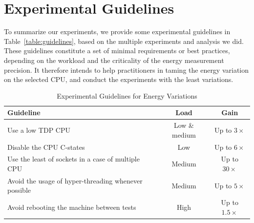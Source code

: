 
\section{Experimental Guidelines}\label{sec:guidelines}
To summarize our experiments, we provide some experimental guidelines in Table~\ref{table:guidelines}, based on the multiple experiments and analysis we did.
These guidelines constitute a set of minimal requirements or best practices, depending on the workload and the criticality of the energy measurement precision.
It therefore intends to help practitioners in taming the energy variation on the selected CPU, and conduct the experiments with the least variations.

\begin{table}[h!]
    \centering
    \caption{Experimental Guidelines for Energy Variations}
    \small
    \begin{tabular}{|p{4.7cm}|c|c|}
        \hline
        \textbf{Guideline}                                                                                                                                                & \textbf{Load} & \textbf{Gain}     \\
        \hline
        \hline
        Use a low TDP CPU                                                                                                                                                 & Low \& medium & Up to $3\times$   \\
        \hline
        Disable the CPU C-states                                                                                                                                          & Low           & Up to $6\times$   \\
        \hline
        Use the least of sockets in a case of multiple CPU                                                                                                                & Medium        & Up to $30\times$  \\
        \hline
        Avoid the usage of hyper-threading whenever possible                                                                                                              & Medium        & Up to $5\times$   \\
        \hline
        Avoid rebooting the machine between tests                                                                                                                         & High          & Up to $1.5\times$ \\

\end{tabular}
\end{table}
